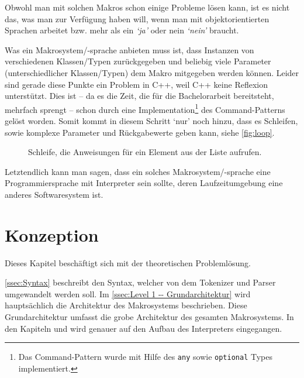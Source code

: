     Obwohl man mit solchen Makros schon einige Probleme lösen kann, ist es nicht das, was man zur Verfügung haben will, wenn man mit objektorientierten Sprachen arbeitet bzw. mehr als ein \textit{`ja'} oder nein \textit{`nein'} braucht.

    Was ein Makrosystem/-sprache anbieten muss ist, dass Instanzen von verschiedenen Klassen/Typen zurückgegeben und beliebig viele Parameter (unterschiedlicher Klassen/Typen) dem Makro mitgegeben werden können. Leider sind gerade diese Punkte ein Problem in C++, weil C++ keine Reflexion\autocites{vinoski2005time}{ferber1989computational} unterstützt. Dies ist -- da es die Zeit, die für die Bachelorarbeit bereitsteht, mehrfach sprengt -- schon durch eine Implementation\footnote{%
      Das Command-Pattern wurde mit Hilfe des \texttt{any}
      sowie \texttt{optional}
      Types implementiert.
    }\spewnotes{}
    des Command-Patterns gelöst worden. Somit kommt in diesem Schritt `nur' noch hinzu, dass es Schleifen, sowie komplexe Parameter und Rückgabewerte geben kann, siehe \autoref{fig:loop}.

    \begin{figure}[H]
      \centering
      
      \caption{Schleife, die Anweisungen für ein Element aus der Liste aufrufen.}
      \label{fig:loop}
    \end{figure}

    Letztendlich kann man sagen, dass ein solches Makrosystem/-sprache eine Programmiersprache mit Interpreter sein sollte, deren Laufzeitumgebung eine anderes Softwaresystem ist.

\section{Konzeption}
\label{sec:Konzeption}
  Dieses Kapitel beschäftigt sich mit der theoretischen Problemlösung.

  \autoref{ssec:Syntax} beschreibt den Syntax, welcher von dem Tokenizer und Parser umgewandelt werden soll. Im \autoref{ssec:Level 1 -- Grundarchitektur} wird hauptsächlich die Architektur des Makrosystems beschrieben. Diese Grundarchitektur umfasst die grobe Architektur des gesamten Makrosystems. In den Kapiteln  und
   wird genauer auf den Aufbau des Interpreters eingegangen.

